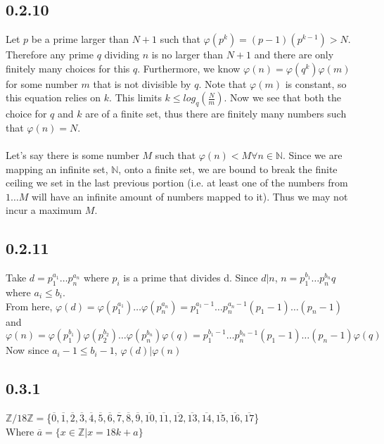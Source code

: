 \documentclass[11pt]{article}
\begin{document}
	\subsection*{0.2.10}
		Let $p$ be a prime larger than $N+1$ such that $\varphi(p^k) = (p-1)(p^{k-1}) > N$.  Therefore any prime $q$ dividing $n$ is no larger than $N+1$ and there are only
		finitely many choices for this $q$. Furthermore, we know $\varphi(n) = \varphi(q^k)\varphi(m)$ for some number $m$ that is not divisible by $q$.  Note that $\varphi(m)$ is 
		constant, so this equation relies on $k$.  This limits $k \leq log_q(\frac{N}{m})$.  Now we see that both the choice for $q$ and $k$ are of a finite set, thus there are finitely
		many numbers such that $\varphi(n) = N$.\\
		\\
		Let's say there is some number $M$ such that $\varphi(n) < M \forall n \in \mathbb{N}$.  Since we are mapping an infinite set, $\mathbb{N}$, onto a finite set, we are bound to
		break the finite ceiling we set in the last previous portion (i.e. at least one of the numbers from $1\dots M$ will have an infinite amount of numbers mapped to it).  Thus we
		may not incur a maximum $M$.
	\subsection*{0.2.11}
		Take $d = p_1^{a_1} \dots p_n^{a_n}$ where $p_i$ is a prime that divides d.  Since $d|n$, $n = p_1^{b_1} \dots p_n^{b_n}q$ where $a_i \leq b_i$.\\
	  	From here, $\varphi(d) = \varphi(p_1^{a_1}) \dots \varphi(p_n^{a_n}) = p_1^{a_1 - 1} \dots p_n^{a_n - 1}(p_1 - 1) \dots (p_n - 1)$ and \\ 
		$\varphi(n) = \varphi(p_1^{b_1})\varphi(p_2^{b_2}) \dots \varphi(p_n^{b_n})\varphi(q) = p_1^{b_1 - 1} \dots p_n^{b_n - 1}(p_1 - 1) \dots (p_n - 1) \varphi(q)$\\
		Now since $a_i - 1 \leq b_i - 1$, $\varphi(d)|\varphi(n)$

	\subsection*{0.3.1}
		$\mathbb{Z}/18\mathbb{Z} =$\{$\overline{0},\overline{1},\overline{2},\overline{3},\overline{4},\overline{5},\overline{6},\overline{7},\overline{8},\overline{9},
		\overline{10},\overline{11},\overline{12},\overline{13},\overline{14},\overline{15},\overline{16},\overline{17}$\}\\
		Where $\overline a = \{ x \in \mathbb{Z} | x = 18k + a  \}$
\end{document}
